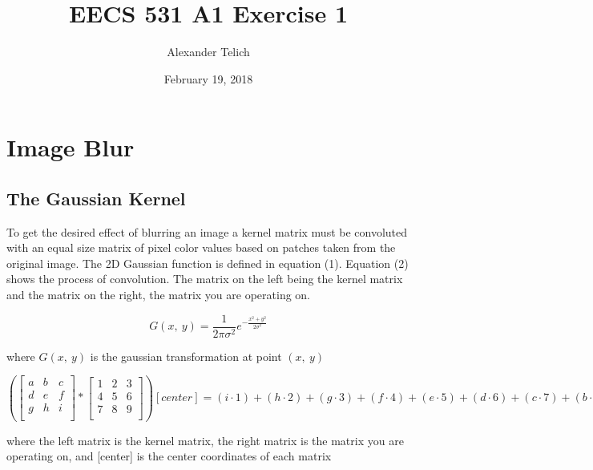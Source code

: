 \documentclass[11pt]{article}
\author{Alexander Telich}
\title{EECS 531 A1 Exercise 1}
\date{February 19, 2018}
\begin{document}
    \maketitle
    \section{Image Blur}\label{sec:exercise1}
    \subsection{The Gaussian Kernel}\label{subsec:1. The Gaussian Kernel}
    \setlength\parindent{24pt}
    To get the desired effect of blurring an image a kernel matrix must be convoluted with
    an equal size matrix of pixel color values based on patches taken from the original image.
    The 2D Gaussian function is defined in equation (1).
    Equation (2) shows the process of convolution.
    The matrix on the left being the kernel matrix and the matrix on the right, the matrix
    you are operating on.

    \begin{equation}
        G\left(x,\ y\right)=\frac{1}{2\pi\sigma^2}e^{-\frac{x^2+y^2}{2\sigma^2}}
    \end{equation}
    {\small \begin{center}
                where $G\left(x,\ y\right)$ is the gaussian transformation at point $\left(x,\ y\right)$\\
    \end{center}}
    \newline

    \begin{equation}
        \left(\left[\begin{matrix}
                        a&b&c\\d&e&f\\g&h&i\\
        \end{matrix}\right]\ast\left[\begin{matrix}
                                         1&2&3\\4&5&6\\7&8&9\\
        \end{matrix}\right]\right)\left[center\right]=\left(i\cdot1\right)+\left(h\cdot2\right)+\left(g\cdot3\right)+\left(f\cdot4\right)+\left(e\cdot5\right)+\left(d\cdot6\right)+\left(c\cdot7\right)+\left(b\cdot8\right)+\left(a\cdot9\right)
    \end{equation}
    {\small \begin{center}
                where the left matrix is the kernel matrix, the right matrix is the
                matrix you are operating on, and [center] is the center coordinates of each
                matrix
    \end{center}}
\end{document}
